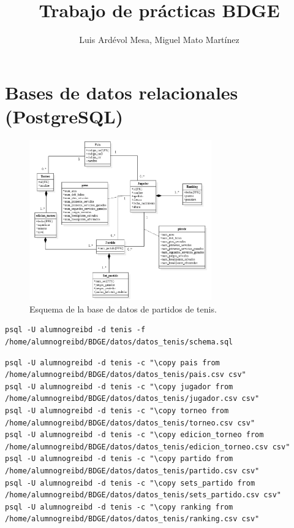 \documentclass[10pt]{opticajnl}
\title{Trabajo de prácticas BDGE}
\author[1,2,3]{Luis Ardévol Mesa, Miguel Mato Martínez}
\begin{document}
\maketitle

\section{Bases de datos relacionales (PostgreSQL)}

\begin{figure}[H]
  \centering
  \includegraphics[width=0.7\textwidth]{fotos/esquema.png}
  \caption{Esquema de la base de datos de partidos de tenis.}
  \label{fig:schbd}
\end{figure}

\begin{lstlisting}[style=terminal]
psql -U alumnogreibd -d tenis -f /home/alumnogreibd/BDGE/datos/datos_tenis/schema.sql
\end{lstlisting}

\begin{lstlisting}[style=terminal]
psql -U alumnogreibd -d tenis -c "\copy pais from /home/alumnogreibd/BDGE/datos/datos_tenis/pais.csv csv"
psql -U alumnogreibd -d tenis -c "\copy jugador from /home/alumnogreibd/BDGE/datos/datos_tenis/jugador.csv csv"
psql -U alumnogreibd -d tenis -c "\copy torneo from /home/alumnogreibd/BDGE/datos/datos_tenis/torneo.csv csv"
psql -U alumnogreibd -d tenis -c "\copy edicion_torneo from /home/alumnogreibd/BDGE/datos/datos_tenis/edicion_torneo.csv csv"
psql -U alumnogreibd -d tenis -c "\copy partido from /home/alumnogreibd/BDGE/datos/datos_tenis/partido.csv csv"
psql -U alumnogreibd -d tenis -c "\copy sets_partido from /home/alumnogreibd/BDGE/datos/datos_tenis/sets_partido.csv csv"
psql -U alumnogreibd -d tenis -c "\copy ranking from /home/alumnogreibd/BDGE/datos/datos_tenis/ranking.csv csv"
\end{lstlisting}
\end{document}
